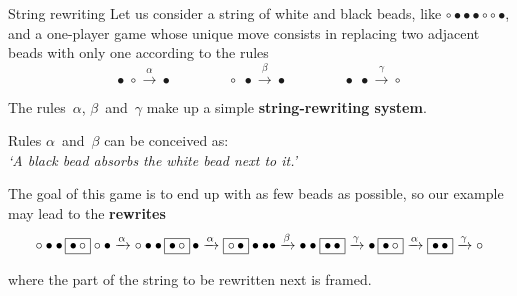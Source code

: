 \documentclass[compress,dvipdfmx]{beamer}
\begin{document}
%
\begin{frame}{String rewriting}
  Let us consider a string of white and black beads, like \(\circ
  \bullet \bullet \bullet \circ \circ \bullet\), and a one-player game
  whose unique move consists in replacing two adjacent beads with only
  one according to the rules
  \begin{equation*}
    \bullet \; \circ   \xrightarrow{\alpha} \bullet\qquad\qquad
    \circ   \; \bullet \xrightarrow{\beta} \bullet\qquad\qquad
    \bullet \; \bullet \xrightarrow{\gamma} \circ
  \end{equation*}

  The rules~\(\alpha\), \(\beta\)~and~\(\gamma\) make up a simple
  \textbf{string\hyp{}rewriting system}.

  \bigskip

  Rules \(\alpha\)~and~\(\beta\) can be conceived as:\\ \emph{`A black
  bead absorbs the white bead next to it.'}

  \bigskip

  The goal of this game is to end up with as few beads as possible, so
  our example may lead to the \textbf{rewrites}
  \begin{equation*}
    \circ \bullet \bullet \, \fbox{\(\bullet \, \circ\)} \circ \bullet
    \xrightarrow{\alpha} \circ \bullet \bullet \, \fbox{\(\bullet \,
      \circ\)} \, \bullet \xrightarrow{\alpha} \fbox{\(\circ \,
      \bullet\)} \bullet \bullet \bullet \xrightarrow{\beta} \bullet
    \bullet \fbox{\(\bullet \, \bullet\)} \xrightarrow{\gamma} \bullet \,
    \fbox{\(\bullet \, \circ\)} \xrightarrow{\alpha} \fbox{\(\bullet
      \, \bullet\)} \xrightarrow{\gamma} \circ
  \end{equation*}

  \medskip

  \noindent where the part of the string to be rewritten next is
  framed.

\end{frame}
\end{document}
